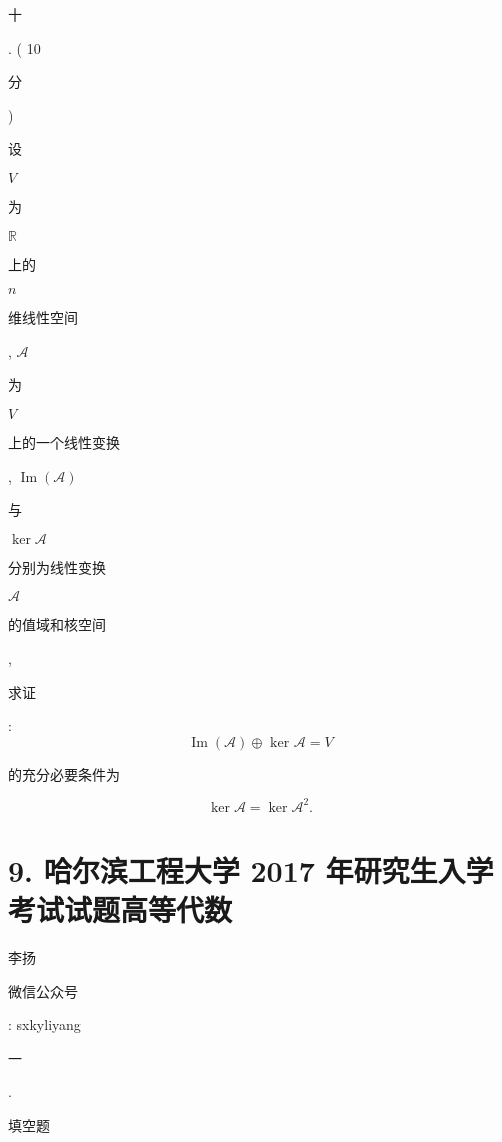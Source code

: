 \documentclass[10pt]{article}
\begin{document}
\begin{CJK}{UTF8}{mj}十\end{CJK}. ( 10 \begin{CJK}{UTF8}{mj}分\end{CJK}) \begin{CJK}{UTF8}{mj}设\end{CJK} $V$ \begin{CJK}{UTF8}{mj}为\end{CJK} $\mathbb{R}$ \begin{CJK}{UTF8}{mj}上的\end{CJK} $n$ \begin{CJK}{UTF8}{mj}维线性空间\end{CJK}, $\mathscr{A}$ \begin{CJK}{UTF8}{mj}为\end{CJK} $V$ \begin{CJK}{UTF8}{mj}上的一个线性变换\end{CJK}, $\operatorname{Im}(\mathscr{A})$ \begin{CJK}{UTF8}{mj}与\end{CJK} $\operatorname{ker} \mathscr{A}$ \begin{CJK}{UTF8}{mj}分别为线性变换\end{CJK} $\mathscr{A}$ \begin{CJK}{UTF8}{mj}的值域和核空间\end{CJK}, \begin{CJK}{UTF8}{mj}求证\end{CJK}:
$$
\operatorname{Im}(\mathscr{A}) \oplus \text { ker } \mathscr{A}=V
$$
\begin{CJK}{UTF8}{mj}的充分必要条件为\end{CJK}
$$
\operatorname{ker} \mathscr{A}=\operatorname{ker} \mathscr{A}^{2} .
$$

\section{9. 哈尔滨工程大学 2017 年研究生入学考试试题高等代数}
\begin{CJK}{UTF8}{mj}李扬\end{CJK}

\begin{CJK}{UTF8}{mj}微信公众号\end{CJK}: sxkyliyang

\begin{CJK}{UTF8}{mj}一\end{CJK}. \begin{CJK}{UTF8}{mj}填空题\end{CJK}
\end{document}
